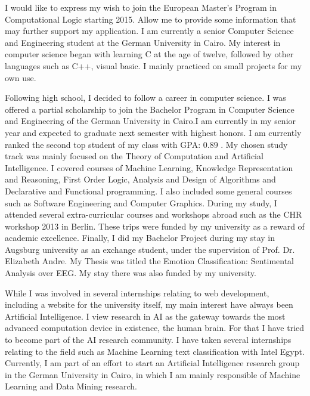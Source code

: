 \documentclass[10pt,stdletter,dateno,sigleft]{newlfm} %
\begin{document}
\begin{newlfm}


  I would like to express my wish to join the European Master's Program in
  Computational Logic starting 2015.
  Allow me to provide some information that may further support my application.
  I am currently a senior Computer Science and Engineering student at the German
  University in Cairo.  My interest in computer science began with learning C at the age of twelve,
  followed by other languages such as C++, visual basic. I mainly practiced on
  small projects for my own use.  

  Following high school, I decided to follow a career in computer science. I was
  offered a partial scholarship to join the Bachelor Program in Computer Science
  and Engineering of the German University in Cairo.I am currently in my senior
  year and expected to graduate next semester with highest honors. I am
  currently ranked the second top student of my class with GPA: $0.89$ . My
  chosen study track was mainly focused on the Theory of Computation and
  Artificial Intelligence. I covered courses of Machine Learning, Knowledge
  Representation and Reasoning, First Order Logic, Analysis and Design of
  Algorithms and Declarative and Functional
  programming. I also included some general courses such as Software Engineering
  and Computer Graphics. During my study, I attended several extra-curricular courses and
  workshops abroad such as the CHR workshop 2013 in Berlin. These trips were
  funded by my university as a reward of academic excellence. Finally, I did my
  Bachelor Project during my stay in Augsburg university as an exchange student,
  under the supervision of Prof. Dr. Elizabeth Andre. My Thesis was titled the
  Emotion Classification: Sentimental Analysis over EEG. My stay there was also
  funded by my university.

  While I was involved in several internships relating to web development,
  including a website for the university itself, my main interest have always
  been Artificial Intelligence. I view research in AI as the gateway towards the
  most advanced computation device in existence, the human brain. For that I have
  tried to become part of the AI research community. I have taken several
  internships relating to the field such as Machine Learning text classification
  with Intel Egypt. Currently, I am part of an effort to start an Artificial
  Intelligence research group in the German University in Cairo, in which I am
  mainly responsible of Machine Learning and Data Mining research.
  

\end{newlfm}
\end{document}
